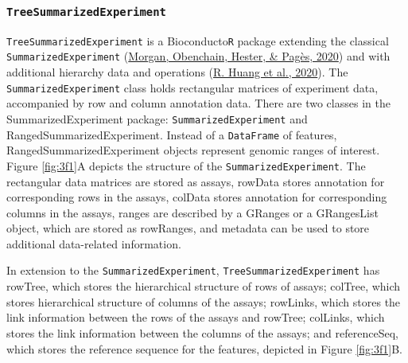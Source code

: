 \documentclass[12pt,twoside]{reedthesis}
\begin{document}
\hypertarget{treesummarizedexperiment}{%
\subsubsection{\texorpdfstring{\texttt{TreeSummarizedExperiment}}{TreeSummarizedExperiment}}\label{treesummarizedexperiment}}

\texttt{TreeSummarizedExperiment} is a Bioconducto\texttt{R} package extending the
classical \texttt{SummarizedExperiment} (\protect\hyperlink{ref-morgan2020}{Morgan, Obenchain, Hester, \& Pagès, 2020}) and with additional
hierarchy data and operations (\protect\hyperlink{ref-huang2020}{R. Huang et al., 2020}). The \texttt{SummarizedExperiment}
class holds rectangular matrices of experiment data, accompanied by row
and column annotation data. There are two classes in the
SummarizedExperiment package: \texttt{SummarizedExperiment} and
RangedSummarizedExperiment. Instead of a \texttt{DataFrame} of features,
RangedSummarizedExperiment objects represent genomic ranges of interest.
Figure \ref{fig:3f1}A depicts the structure of the \texttt{SummarizedExperiment}. The
rectangular data matrices are stored as assays, rowData stores
annotation for corresponding rows in the assays, colData stores
annotation for corresponding columns in the assays, ranges are described
by a GRanges or a GRangesList object, which are stored as rowRanges, and
metadata can be used to store additional data-related information.

In extension to the \texttt{SummarizedExperiment}, \texttt{TreeSummarizedExperiment} has
rowTree, which stores the hierarchical structure of rows of assays;
colTree, which stores hierarchical structure of columns of the assays;
rowLinks, which stores the link information between the rows of the
assays and rowTree; colLinks, which stores the link information between
the columns of the assays; and referenceSeq, which stores the reference
sequence for the features, depicted in Figure \ref{fig:3f1}B.
\end{document}
